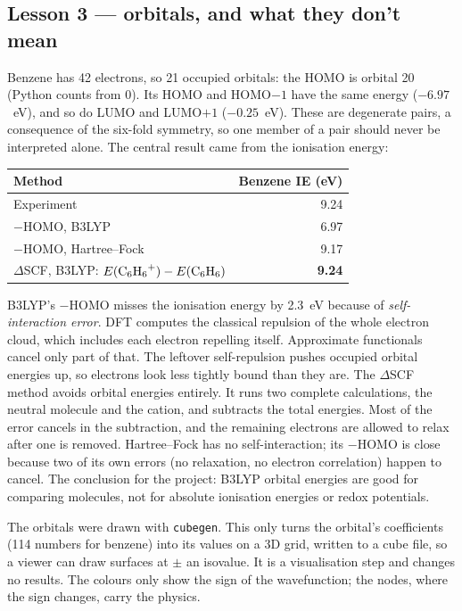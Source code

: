 \documentclass[11pt,a4paper]{article}
\begin{document}
\subsection*{Lesson 3 --- orbitals, and what they don't mean}
Benzene has 42 electrons, so 21 occupied orbitals: the HOMO is orbital 20 (Python counts from 0).
Its HOMO and HOMO$-1$ have the same energy ($-6.97$~eV), and so do LUMO and LUMO$+1$ ($-0.25$~eV).
These are degenerate pairs, a consequence of the six-fold symmetry, so one member of a pair should
never be interpreted alone. The central result came from the ionisation energy:

\begin{center}\small
\begin{tabular}{@{}lr@{}}
\toprule
Method & Benzene IE (eV) \\
\midrule
Experiment & 9.24 \\
$-$HOMO, B3LYP & 6.97 \\
$-$HOMO, Hartree--Fock & 9.17 \\
$\Delta$SCF, B3LYP: $E(\ce{C6H6+}) - E(\ce{C6H6})$ & \textbf{9.24} \\
\bottomrule
\end{tabular}
\end{center}

B3LYP's $-$HOMO misses the ionisation energy by 2.3~eV because of \emph{self-interaction error}.
DFT computes the classical repulsion of the whole electron cloud, which includes each electron
repelling itself. Approximate functionals cancel only part of that. The leftover self-repulsion
pushes occupied orbital energies up, so electrons look less tightly bound than they are. The
$\Delta$SCF method avoids orbital energies entirely. It runs two complete calculations, the neutral
molecule and the cation, and subtracts the total energies. Most of the error cancels in the
subtraction, and the remaining electrons are allowed to relax after one is removed. Hartree--Fock
has no self-interaction; its $-$HOMO is close because two of its own errors (no relaxation, no
electron correlation) happen to cancel. The conclusion for the project: B3LYP orbital energies are
good for comparing molecules, not for absolute ionisation energies or redox potentials.

The orbitals were drawn with \texttt{cubegen}. This only turns the orbital's coefficients (114
numbers for benzene) into its values on a 3D grid, written to a cube file, so a viewer can draw
surfaces at $\pm$ an isovalue. It is a visualisation step and changes no results. The colours only
show the sign of the wavefunction; the nodes, where the sign changes, carry the physics.
\end{document}
